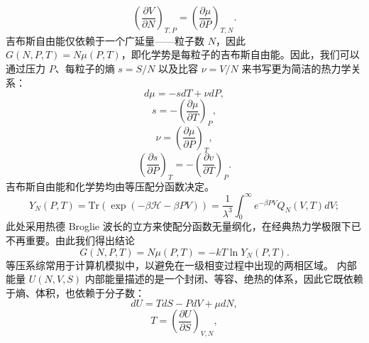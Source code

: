 \begin{equation}\tag{17.11.20}\label{eq:17.11.20}
\left( \frac { \partial V } { \partial N } \right) _ { T , P } = \left( \frac { \partial \mu } { \partial P } \right) _ { T , N } .
\end{equation}
吉布斯自由能仅依赖于一个广延量——粒子数 \(N\)，因此 \(G(N,P,T)=N\mu(P,T)\)，即化学势是每粒子的吉布斯自由能。因此，我们可以通过压力 \(P\)、每粒子的熵 \(s=S/N\) 以及比容 \(\nu=V/N\) 来书写更为简洁的热力学关系：
\begin{equation}\tag{17.11.21}\label{eq:17.11.21}
d \mu = - s d T + \nu d P ,
\end{equation}
\begin{equation}\tag{17.11.22}\label{eq:17.11.22}
s = - \left( { \frac { \partial \mu } { \partial T } } \right) _ { P } ,
\end{equation}
\begin{equation}\tag{17.11.23}\label{eq:17.11.23}
\nu = \left( \frac { \partial \mu } { \partial P } \right) _ { T } ,
\end{equation}
\begin{equation}\tag{17.11.24}\label{eq:17.11.24}
\left( \frac { \partial s } { \partial P } \right) _ { T } = - \left( \frac { \partial v } { \partial T } \right) _ { P } .
\end{equation}
吉布斯自由能和化学势均由等压配分函数决定。
\begin{equation}\tag{17.11.25}\label{eq:17.11.25}
Y _ { N } ( P , T ) = \mathrm { T r } \left( \exp ( - \beta \mathcal { H } - \beta P V ) \right) = \frac { 1 } { \lambda ^{3} } \int _ { 0 } ^{\infty} e ^{- \beta P V} Q _ { N } ( V , T ) d V ;
\end{equation}
此处采用热德 Broglie 波长的立方来使配分函数无量纲化，在经典热力学极限下已不再重要。由此我们得出结论
\begin{equation}\tag{17.11.26}\label{eq:17.11.26}
G ( N , P , T ) = N \mu ( P , T ) = - k T \ln Y _ { N } ( P , T ) .
\end{equation}
等压系综常用于计算机模拟中，以避免在一级相变过程中出现的两相区域。
内部能量 \(U(N,V,S)\)
内部能量描述的是一个封闭、等容、绝热的体系，因此它既依赖于熵、体积，也依赖于分子数：
\begin{equation}\tag{17.11.27}\label{eq:17.11.27}
d U = T d S - P d V + \mu d N ,
\end{equation}
\begin{equation}\tag{17.11.28}\label{eq:17.11.28}
T = \left( \frac { \partial U } { \partial S } \right) _ { V , N } ,
\end{equation}

